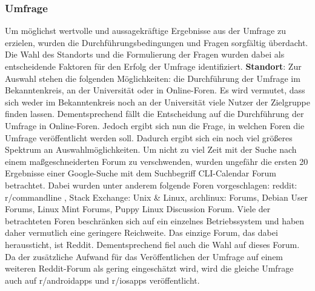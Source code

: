 \subsubsection{Umfrage}\label{subsection:umfrage}
Um möglichst wertvolle und aussagekräftige Ergebnisse aus der Umfrage zu erzielen, wurden die Durchführungsbedingungen und Fragen sorgfältig überdacht. %
Die Wahl des Standorts und die Formulierung der Fragen wurden dabei als entscheidende Faktoren für den Erfolg der Umfrage identifiziert.%
%
\newline%
\myNewSection
\textbf{Standort}: %
Zur Auswahl stehen die folgenden Möglichkeiten: die Durchführung der Umfrage im Bekanntenkreis, an der Universität oder in Online-Foren.\newline%
Es wird vermutet, dass sich weder im Bekanntenkreis noch an der Universität viele Nutzer der Zielgruppe finden lassen.\newline%
Dementsprechend fällt die Entscheidung auf die Durchführung der Umfrage in Online-Foren. %
Jedoch ergibt sich nun die Frage, in welchen Foren die Umfrage veröffentlicht werden soll. %
	Dadurch ergibt sich ein noch viel größeres Spektrum an Auswahlmöglichkeiten. %
	Um nicht zu viel Zeit mit der Suche nach einem maßgeschneiderten Forum zu verschwenden, wurden ungefähr die ersten 20 Ergebnisse einer Google-Suche mit dem Suchbegriff \glqq CLI-Calendar Forum\grqq{} betrachtet. %
	Dabei wurden unter anderem folgende Foren vorgeschlagen: \glqq reddit: r/commandline\grqq{}\cite{forum_rCommandLine} , \glqq Stack Exchange: Unix \& Linux\grqq{}\cite{forum_unixAndLinux}, \glqq archlinux: Forums\grqq{}\cite{forum_archlinux}, \glqq Debian User Forums\grqq{}\cite{forum_debianUserForums}, \glqq Linux Mint Forums\grqq{}\cite{forum_linuxMintForums}, \glqq Puppy Linux Discussion Forum\grqq{}\cite{forum_puppyLinux}. %
	Viele der betrachteten Foren beschränken sich auf ein einzelnes Betriebssystem und haben daher vermutlich eine geringere Reichweite. %
		Das einzige Forum, das dabei heraussticht, ist Reddit. Dementsprechend fiel auch die Wahl auf dieses Forum.\newline%
Da der zusätzliche Aufwand für das Veröffentlichen der Umfrage auf einem weiteren Reddit-Forum als gering eingeschätzt wird, wird die gleiche Umfrage auch auf r/androidapps\cite{forum_rAndroidapps} und r/iosapps\cite{forum_rIOSapps} veröffentlicht. 
